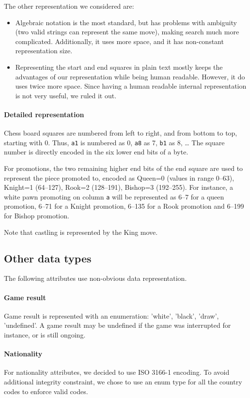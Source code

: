 \documentclass{article}
\begin{document}
The other representation we considered are:
\begin{itemize}
\item Algebraic notation is the most standard, but has problems with ambiguity
(two valid strings can represent the same move), making search much more complicated.
Additionally, it uses more space, and it has non-constant representation size.

\item Representing the start and end squares in plain text mostly keeps the advantages
of our representation while being human readable. However, it do uses twice more space.
Since having a human readable internal representation is not very useful,
we ruled it out.
\end{itemize}


\paragraph{Detailed representation}
Chess board squares are numbered from left to right, and from bottom to top,
starting with 0. Thus, \verb|a1| is numbered as 0, \verb|a8| as 7, \verb|b1| as 8, \dots
The square number is directly encoded in the six lower end bits of a byte.

For promotions, the two remaining higher end bits of the end square are used to represent the piece promoted to,
encoded as Queen=0 (values in range 0--63), Knight=1 (64--127), Rook=2 (128--191), Bishop=3 (192--255).
For instance, a white pawn promoting on column \verb|a| will be represented as 6--7 for a queen promotion,
6--71 for a Knight promotion, 6--135 for a Rook promotion and 6--199 for Bishop promotion.

Note that castling is represented by the King move.


\subsection{Other data types}
The following attributes use non-obvious data representation.

\paragraph{Game result}
Game result is represented with an enumeration: 'white', 'black', 'draw', 'undefined'.
A game result may be undefined if the game was interrupted for instance, or is still ongoing.

\paragraph{Nationality}
For nationality attributes, we decided to use ISO 3166-1 encoding.
To avoid additional integrity constraint, we chose to use an enum type for all the country codes
to enforce valid codes.
\end{document}
